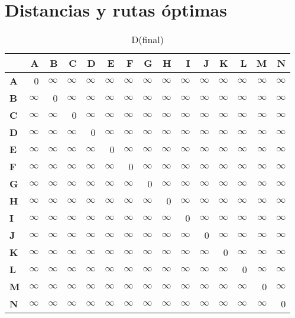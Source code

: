 \documentclass{article}
\newcommand{\INF}{$\infty$}
\begin{document}
\section*{Distancias y rutas óptimas}
\begin{table}[H]\centering
\caption{D(final)}
\begin{tabular}{l r r r r r r r r r r r r r r}
\toprule
 & \textbf{A} & \textbf{B} & \textbf{C} & \textbf{D} & \textbf{E} & \textbf{F} & \textbf{G} & \textbf{H} & \textbf{I} & \textbf{J} & \textbf{K} & \textbf{L} & \textbf{M} & \textbf{N}\\\midrule
\textbf{A} & 0 & \INF & \INF & \INF & \INF & \INF & \INF & \INF & \INF & \INF & \INF & \INF & \INF & \INF \\
\textbf{B} & \INF & 0 & \INF & \INF & \INF & \INF & \INF & \INF & \INF & \INF & \INF & \INF & \INF & \INF \\
\textbf{C} & \INF & \INF & 0 & \INF & \INF & \INF & \INF & \INF & \INF & \INF & \INF & \INF & \INF & \INF \\
\textbf{D} & \INF & \INF & \INF & 0 & \INF & \INF & \INF & \INF & \INF & \INF & \INF & \INF & \INF & \INF \\
\textbf{E} & \INF & \INF & \INF & \INF & 0 & \INF & \INF & \INF & \INF & \INF & \INF & \INF & \INF & \INF \\
\textbf{F} & \INF & \INF & \INF & \INF & \INF & 0 & \INF & \INF & \INF & \INF & \INF & \INF & \INF & \INF \\
\textbf{G} & \INF & \INF & \INF & \INF & \INF & \INF & 0 & \INF & \INF & \INF & \INF & \INF & \INF & \INF \\
\textbf{H} & \INF & \INF & \INF & \INF & \INF & \INF & \INF & 0 & \INF & \INF & \INF & \INF & \INF & \INF \\
\textbf{I} & \INF & \INF & \INF & \INF & \INF & \INF & \INF & \INF & 0 & \INF & \INF & \INF & \INF & \INF \\
\textbf{J} & \INF & \INF & \INF & \INF & \INF & \INF & \INF & \INF & \INF & 0 & \INF & \INF & \INF & \INF \\
\textbf{K} & \INF & \INF & \INF & \INF & \INF & \INF & \INF & \INF & \INF & \INF & 0 & \INF & \INF & \INF \\
\textbf{L} & \INF & \INF & \INF & \INF & \INF & \INF & \INF & \INF & \INF & \INF & \INF & 0 & \INF & \INF \\
\textbf{M} & \INF & \INF & \INF & \INF & \INF & \INF & \INF & \INF & \INF & \INF & \INF & \INF & 0 & \INF \\
\textbf{N} & \INF & \INF & \INF & \INF & \INF & \INF & \INF & \INF & \INF & \INF & \INF & \INF & \INF & 0 \\
\bottomrule
\end{tabular}
\end{table}
\end{document}
